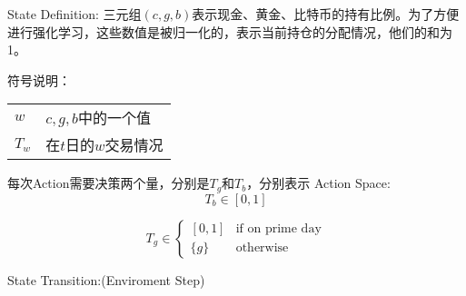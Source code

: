 \documentclass[a4paper]{ctexart}
\begin{document}
    State Definition:
    三元组$(c, g, b)$表示现金、黄金、比特币的持有比例。为了方便进行强化学习，这些数值是被归一化的，表示当前持仓的分配情况，他们的和为1。

    符号说明：

    \begin{table}
        \centering
        \begin{tabular}{ll}
            $w$ & $c, g, b$中的一个值 \\ 
            $T_w$ & 在$t$日的$w$交易情况 \\
        \end{tabular}
    \end{table}

    每次Action需要决策两个量，分别是$T_g$和$T_b$，分别表示
    Action Space:
    \[
        T_b \in [0, 1]
    \]

    \[
        T_g \in 
        \begin{cases}
            [0, 1] & \mbox{if on prime day} \\
            \{g\} & \mbox{otherwise}
        \end{cases}    
    \]

    State Transition:(Enviroment Step)
\end{document}
